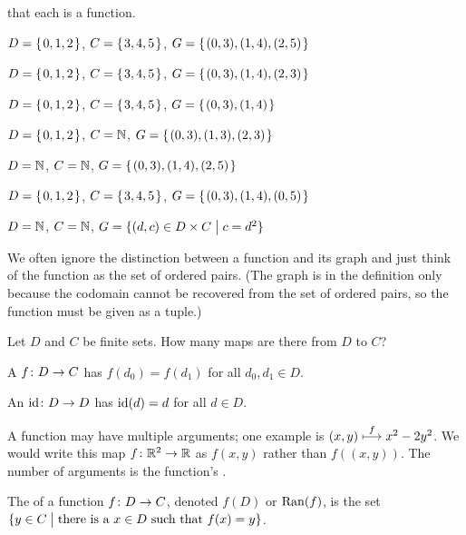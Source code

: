 \documentclass{ibl}
\begin{document}
\begin{ex} \pord{} that each is a function.\label{FindFunctions}
\begin{exes}
\item $D=\mbox{$\{\hspace{0.1em}0,1,2\hspace{0.1em}\}$}$, $C=\mbox{$\{\hspace{0.1em}3,4,5\hspace{0.1em}\}$}$,
  $G=\mbox{$\{\hspace{0.1em}(0,3), (1,4), (2,5)\hspace{0.1em}\}$}$    
\item $D=\mbox{$\{\hspace{0.1em}0,1,2\hspace{0.1em}\}$}$, $C=\mbox{$\{\hspace{0.1em}3,4,5\hspace{0.1em}\}$}$,
  $G=\mbox{$\{\hspace{0.1em}(0,3), (1,4), (2,3)\hspace{0.1em}\}$}$    
\item $D=\mbox{$\{\hspace{0.1em}0,1,2\hspace{0.1em}\}$}$, $C=\mbox{$\{\hspace{0.1em}3,4,5\hspace{0.1em}\}$}$,
  $G=\mbox{$\{\hspace{0.1em}(0,3), (1,4)\hspace{0.1em}\}$}$    
\item $D=\mbox{$\{\hspace{0.1em}0,1,2\hspace{0.1em}\}$}$, $C=\mathbb{N}$,
  $G=\mbox{$\{\hspace{0.1em}(0,3), (1,3), (2,3)\hspace{0.1em}\}$}$    
\item $D=\mathbb{N}$, $C=\mathbb{N}$,
  $G=\mbox{$\{\hspace{0.1em}(0,3), (1,4), (2,5)\hspace{0.1em}\}$}$    
\item $D=\mbox{$\{\hspace{0.1em}0,1,2\hspace{0.1em}\}$}$, $C=\mbox{$\{\hspace{0.1em}3,4,5\hspace{0.1em}\}$}$,
  $G=\mbox{$\{\hspace{0.1em}(0,3), (1,4), (0,5)\hspace{0.1em}\}$}$    
\item $D=\mathbb{N}$, $C=\mathbb{N}$,
  $G=\{(d,c)\in D\times C \bigm| c=d^2\}$    
\end{exes}
\end{ex}

We often ignore the distinction between a function and its graph
and just
think of the function as the set of ordered pairs.
(The graph is in the definition only 
because the codomain cannot be recovered
from the set of ordered pairs, so the function must be 
given as a tuple.)

\begin{ex}
Let $D$ and $C$ be finite sets.
How many maps are there from $D$ to $C$?
\end{ex}

\begin{df}
A  $\mbox{$f\colon D\to C$}$ has  
$f(d_0)=f(d_1)$ for all $d_0,d_1\in D$.
\end{df}\begin{df}
An  $\mbox{$\operatorname{id}\colon D\to D$}$ has
$\operatorname{id}(d)=d$ for all $d\in D$.
\end{df}

A function may have multiple arguments; one example is 
$(x,y)\stackrel{f}{\longmapsto}x^2-2y^2$.
We would write this map $\mbox{$f\colon \mathbb{R}^2\to \mathbb{R}$}$ as 
$f(x,y)$ rather than
$f((x,y))$.
The number of arguments is the function's .

\begin{df}
The  of a function $\mbox{$f\colon D\to C$}$,
denoted  $f(D)$ or $\operatorname{Ran}(f)$,
is the set
$\{y\in C \bigm| \text{there is a $x\in D$ such that $f(x)=y$}\}$.
\end{df}
\end{document}
